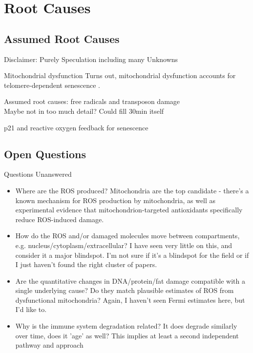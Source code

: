 \section{Root Causes}
\subsection{Assumed Root Causes}

\addtocounter{framenumber}{1}
\begin{frame}[standout]
    Disclaimer: Purely Speculation including many Unknowns
\end{frame}

\begin{frame}[c]{Mitochondrial dysfunction}
    \large
    Turns out, mitochondrial dysfunction accounts for telomere-dependent senescence \cite{passos2007mitochondrial}.
\end{frame}


\begin{frame}[c]
    \large
    Assumed root causes: free radicals and transposon damage \\
    Maybe not in too much detail? Could fill 30min itself \cite{CorePath13:online} \\
    \pause

    p21 and reactive oxygen feedback for senescence \cite{passos2010feedback}
\end{frame}



\subsection{Open Questions}

\begin{frame}[c]{Questions Unanswered}
    \begin{itemize}[<+(1)->]
        \item Where are the ROS produced? Mitochondria are the top candidate - there’s a known mechanism for ROS production by mitochondria, as well as experimental evidence that mitochondrion-targeted antioxidants specifically reduce ROS-induced damage.
        \item How do the ROS and/or damaged molecules move between compartments, e.g. nucleus/cytoplasm/extracellular? I have seen very little on this, and consider it a major blindspot. I’m not sure if it’s a blindspot for the field or if I just haven’t found the right cluster of papers.
        \item Are the quantitative changes in DNA/protein/fat damage compatible with a single underlying cause? Do they match plausible estimates of ROS from dysfunctional mitochondria? Again, I haven’t seen Fermi estimates here, but I’d like to.
        \item Why is the immune system degradation related? It does degrade similarly over time, does it 'age' as well? This implies at least a second independent pathway and approach
    \end{itemize}
\end{frame}
